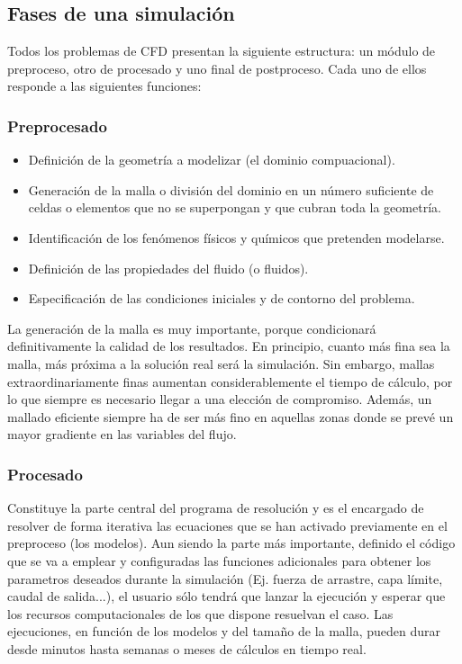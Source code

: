 \subsection{Fases de una simulación}\label{header-n3}

Todos los problemas de CFD presentan la siguiente estructura: un módulo
de preproceso, otro de procesado y uno final de postproceso. Cada uno de
ellos responde a las siguientes funciones:

\subsubsection{Preprocesado}

\begin{itemize}
\item
  Definición de la geometría a modelizar (el dominio compuacional).
\item
  Generación de la malla o división del dominio en un número
  suficiente de celdas o elementos que no se superpongan y que cubran
  toda la geometría.
\item
  Identificación de los fenómenos físicos y químicos que pretenden
  modelarse.
\item
  Definición de las propiedades del fluido (o fluidos).
\item
  Especificación de las condiciones iniciales y de contorno del
  problema.
\end{itemize}

La generación de la malla es muy importante, porque condicionará
definitivamente la calidad de los resultados. En principio, cuanto más
fina sea la malla, más próxima a la solución real será la simulación.
Sin embargo, mallas extraordinariamente finas aumentan considerablemente
el tiempo de cálculo, por lo que siempre es necesario llegar a una
elección de compromiso. Además, un mallado eficiente siempre ha de ser
más fino en aquellas zonas donde se prevé un mayor gradiente en las
variables del flujo.

\subsubsection{Procesado}

Constituye la parte central del programa de resolución y es el
encargado de resolver de forma iterativa las ecuaciones que se han
activado previamente en el preproceso (los modelos). Aun siendo la
parte más importante, definido el código que se va a emplear y
configuradas las funciones adicionales para obtener los parametros
deseados durante la simulación (Ej. fuerza de arrastre, capa límite,
caudal de salida...), el usuario sólo tendrá que lanzar la ejecución y
esperar que los recursos computacionales de los que dispone resuelvan
el caso. Las ejecuciones, en función de los modelos y del tamaño de la
malla, pueden durar desde minutos hasta semanas o meses de cálculos en
tiempo real.

